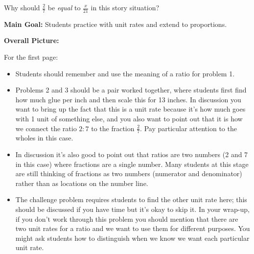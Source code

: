 \documentclass[nooutcomes,noauthor]{ximera}
\begin{document}
\begin{problem}
Why should $\frac{2}{7}$ be {\em equal} to $\frac{x}{21}$ in this story situation?
\end{problem}














\newpage
\begin{instructorNotes}

{\bf Main Goal:} Students practice with unit rates and extend to proportions.

{\bf Overall Picture:}

For the first page:
\begin{itemize}
	\item Students should remember and use the meaning of a ratio for problem 1. 
	\item Problems 2 and 3 should be a pair worked together, where students first find how much glue per inch and then scale this for 13 inches. In discussion you want to bring up the fact that this is a unit rate because it's how much goes with 1 unit of something else, and you also want to point out that it is how we connect the ratio $2:7$ to the fraction $\frac{2}{7}$. Pay particular attention to the wholes in this case.
	\item In discussion it's also good to point out that ratios are two numbers (2 and 7 in this case) where fractions are a single number. Many students at this stage are still thinking of fractions as two numbers (numerator and denominator) rather than as locations on the number line.
	\item The challenge problem requires students to find the other unit rate here; this should be discussed if you have time but it's okay to skip it. In your wrap-up, if you don't work through this problem you should mention that there are two unit rates for a ratio and we want to use them for different purposes. You might ask students how to distinguish when we know we want each particular unit rate.
\end{itemize}


\end{instructorNotes}
\end{document}
